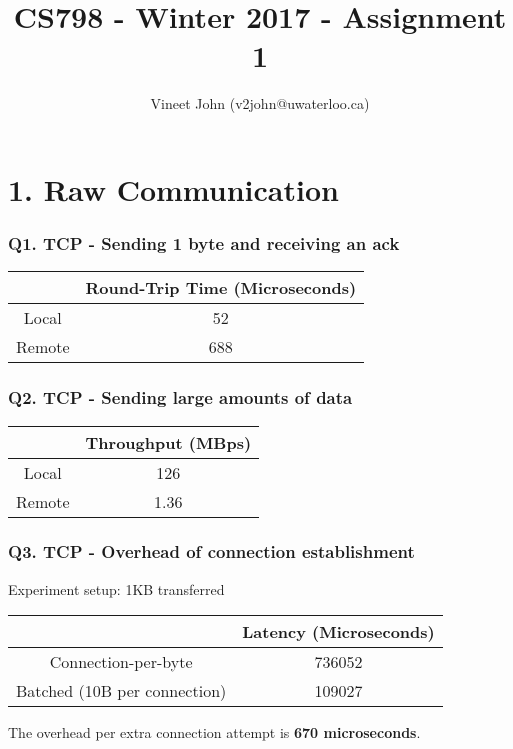 \documentclass[a4paper]{article}
\title{CS798 - Winter 2017 - Assignment 1}
\author{Vineet John (v2john@uwaterloo.ca)}
\date{}
\begin{document}
\maketitle


\part*{1. Raw Communication}

\section*{Q1. TCP - Sending 1 byte and receiving an ack}
\begin{center}
	\begin{tabular}{ |c|c| } 
		\hline
		& Round-Trip Time (Microseconds) \\ 
		\hline
		\hline
		Local & 52 \\ 
		\hline
		Remote & 688 \\ 
		\hline
	\end{tabular}
\end{center}

\section*{Q2. TCP - Sending large amounts of data}
\begin{center}
	\begin{tabular}{ |c|c| } 
		\hline
		& Throughput (MBps) \\ 
		\hline
		\hline
		Local & 126 \\ 
		\hline
		Remote & 1.36 \\ 
		\hline
	\end{tabular}
\end{center}

\section*{Q3. TCP - Overhead of connection establishment}
Experiment setup: 1KB transferred
\begin{center}
	\begin{tabular}{ |c|c| } 
		\hline
		& Latency (Microseconds) \\ 
		\hline
		\hline
		Connection-per-byte & 736052 \\ 
		\hline
		Batched (10B per connection) & 109027 \\ 
		\hline
	\end{tabular}
\end{center}
The overhead per extra connection attempt is \textbf{670 microseconds}.
\end{document}
